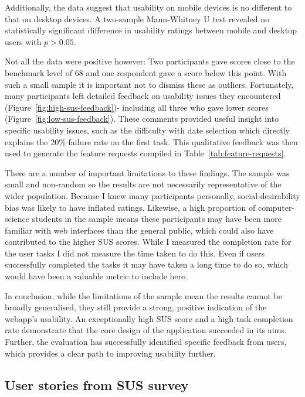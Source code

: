 Additionally, the data suggest that usability on mobile devices is no different
to that on desktop devices. A two-sample Mann-Whitney U test revealed no
statistically significant difference in usability ratings between mobile and
desktop users with \(p>0.05\).

Not all the data were positive however: Two participants gave scores close to
the benchmark level of 68 and one respondent gave a score below this point. With
such a small sample it is important not to dismiss these as outliers.
Fortunately, many participants left detailed feedback on usability issues they
encountered (Figure~\ref{fig:high-sus-feedback})- including all three who gave
lower scores (Figure~\ref{fig:low-sus-feedback}). These comments provided useful
insight into specific usability issues, such as the difficulty with date
selection which directly explains the 20\% failure rate on the first task. This
qualitative feedback was then used to generate the feature requests compiled in
Table~\ref{tab:feature-requests}.

There are a number of important limitations to these findings. The sample was
small and non-random so the results are not necessarily representative of the
wider population. Because I knew many participants personally,
social-desirability bias was likely to have inflated ratings. Likewise, a high
proportion of computer-science students in the sample means these participants
may have been more familiar with web interfaces than the general public, which
could also have contributed to the higher SUS scores. While I measured the
completion rate for the user tasks I did not measure the time taken to do this.
Even if users successfully completed the tasks it may have taken a long time to
do so, which would have been a valuable metric to include here.

In conclusion, while the limitations of the sample mean the results cannot be
broadly generalised, they still provide a strong, positive indication of the
webapp's usability. An exceptionally high SUS score and a high task completion
rate demonstrate that the core design of the application succeeded in its aims.
Further, the evaluation has successfully identified specific feedback from
users, which provides a clear path to improving usability further.

\subsection{User stories from SUS survey} \label{sec:user-story}

